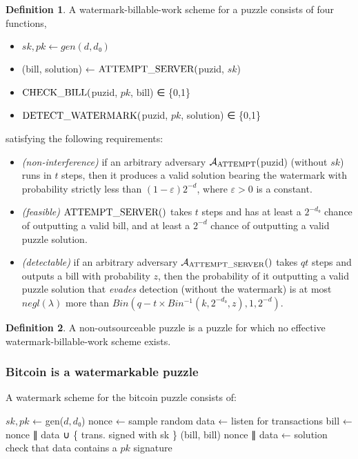 \documentclass{article}
\theoremstyle{definition}
\newtheorem{definition}{Definition}
\theoremstyle{remark}
\newcommand{\hash}{\mathcal{H}}
\newcommand{\Adv}{\mathcal{A}}
\newcommand{\tn}{\textnormal}
\newcommand{\unn}[1]{\uppercase\tn{#1}}
\begin{document}
\begin{definition}A watermark-billable-work scheme for a puzzle consists of four functions,
\end{definition}
\begin{itemize}
\item $sk,pk ← gen(d,d₀)$
\item (bill, solution) ← $\unn{attempt\_server}($puzid, $sk$)
\item $\unn{check\_bill}($puzid, $pk$, bill) ∈ \{0,1\}
\item $\unn{detect\_watermark}($puzid, $pk$, solution) ∈ \{0,1\}
\end{itemize}
satisfying the following requirements:
\begin{itemize}
\item {\em (non-interference)} if an arbitrary adversary $\Adv_{\unn{attempt}}($puzid) (without $sk$) runs in $t$ steps, then it produces a valid solution bearing the watermark with probability strictly less than $(1-ε)2^{-d}$, where $ε>0$ is a constant.
\item {\em (feasible)} $\unn{attempt\_server}()$ takes $t$ steps and has at least a $2^{-d₀}$ chance of outputting a valid bill, and at least a $2^{-d}$ chance of outputting a valid puzzle solution.
\item {\em (detectable)} if an arbitrary adversary $\Adv_{\unn{attempt\_server}}()$ takes $qt$ steps and outputs a bill with probability $z$, then the probability of it outputting a valid puzzle solution that {\em evades} detection  (without the watermark) is at most $negl(λ)$ more than $Bin(q-t×Bin^{-1}(k,2^{-d₀},z), 1, 2^{-d})$.
\end{itemize}

\begin{definition}
A non-outsourceable puzzle is a puzzle for which no effective watermark-billable-work scheme exists.
\end{definition}

\subsubsection{Bitcoin is a watermarkable puzzle}

A watermark scheme for the bitcoin puzzle consists of:

\begin{algorithmic}[0]
  \State
  \State $sk,pk$ ← gen($d,d₀$)
  \State
    \State nonce ← sample random
    \State data ← listen for transactions
    \State bill ← nonce ∥ data ∪ \{ trans. signed with sk \}
    \State \Return (bill, bill)
  \EndFunction
  \State
    \State \Return {$\hash($puzid$ || $bill$) < 2^{-d₀}$}
  \EndFunction
  \State
     \State nonce ∥ data ← solution
     \State check that data contains a $pk$ signature
  \EndFunction
\end{algorithmic}
\end{document}
